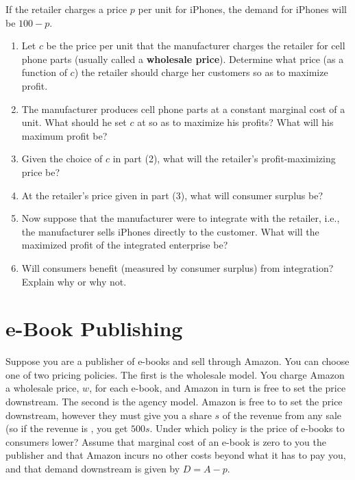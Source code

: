 \documentclass{article}
\begin{document}
If the retailer charges a price $p$ per unit for iPhones, the demand for iPhones will be $100 - p$. 
\begin{enumerate}
\item Let $c$ be the price per unit that the manufacturer charges the retailer for cell phone parts (usually called a \textbf{wholesale price}). Determine what price (as a function of $c$)  the retailer should charge her customers so as to maximize profit.
\item The manufacturer produces cell phone parts at a constant marginal cost of  a unit. What should he set $c$ at so as to maximize his profits? What will his maximum profit be?
\item Given the choice of $c$ in part (2), what will the retailer's profit-maximizing price be?
\item At the retailer's price given in part (3), what will consumer surplus be?
\item Now suppose that the manufacturer were to integrate with the retailer, i.e., the manufacturer sells iPhones directly to the customer. What will the maximized profit of the integrated enterprise be?
\item Will consumers benefit (measured by consumer surplus) from integration?  Explain why or why not.
\end{enumerate}

\section*{e-Book Publishing}
Suppose you are a publisher of e-books and sell through Amazon. You can choose one of two pricing policies. The first is the wholesale model. You charge Amazon a wholesale price, $w$, for each e-book, and Amazon in turn is free to set the price downstream. The second is the agency model. Amazon is free to to set the price downstream, however they must give you a share $s$ of the revenue from any sale (so if the revenue is , you get $500s$. Under which policy is the price of e-books to consumers lower? Assume that marginal cost of an e-book is zero to you the publisher and that Amazon incurs no other costs beyond what it has to pay you, and that demand downstream is given by $D = A - p$.
\end{document}
